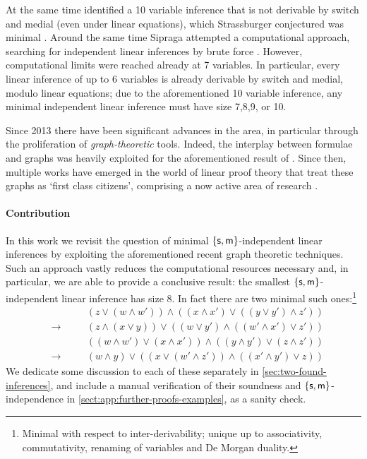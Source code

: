\documentclass[a4paper, UKenglish, cleveref]{lipics-v2019}
\begin{document}
At the same time \cite{Das13:lin-inf-rew} identified a 10 variable inference that is not derivable by switch and medial (even under linear equations), which Strassburger conjectured was minimal \cite{Str12:private-conjecture}.
Around the same time Sipraga attempted a computational approach, searching for independent linear inferences by brute force \cite{Sip12:aut-search-lin-inf}.
However, computational limits were reached already at 7 variables.
In particular, every linear inference of up to 6 variables is already derivable by switch and medial, modulo linear equations; due to the aforementioned 10 variable inference, any minimal independent linear inference must have size 7,8,9, or 10.


Since 2013 there have been significant advances in the area, in particular through the proliferation of \emph{graph-theoretic} tools.
Indeed, the interplay between formulae and graphs was heavily exploited for the aforementioned result of \cite{DasStr15:no-comp-lin-sys,DasStr16:no-compl-lin-sys}.
Since then, multiple works have emerged in the world of linear proof theory that treat these graphs as `first class citizens', comprising a now active area of research \cite{NguSei18:coh-int-graphs,AccHorStr20:mll-graphs-short,AccHorStr20:mll-graphs-full,CalDasWar20:bgl}.


\paragraph*{Contribution}
In this work we revisit the question of minimal $\{\mathsf{s},\mathsf{m}\}$-independent linear inferences by exploiting the aforementioned recent graph theoretic techniques.
Such an approach vastly reduces the computational resources necessary and, in particular, we are able to provide a conclusive result:
the smallest $\{\mathsf{s},\mathsf{m} \}$-independent linear inference has size 8. In fact there are two minimal such ones:\footnote{Minimal with respect to inter-derivability; unique up to associativity, commutativity, renaming of variables and De Morgan duality.}
\begin{equation}
  \label{eq:php32-derived-inf}
  \begin{alignedat}{2}
    & &&(z \lor (w \land w')) \land ((x \land x' ) \lor ((y \lor y') \land z'))\\
    & \to &\quad&(z \land (x \lor y)) \lor ((w \lor y') \land ((w' \land x')  \lor z') )
  \end{alignedat}
\end{equation}
\vspace{-5pt}%
\begin{equation}
  \label{eq:counterexample-inference}
  \begin{alignedat}{2}
    & &&((w \land w') \lor (x \land x')) \land ((y \land y') \lor (z \land z'))\\
    & \to&\quad& (w \land y) \lor ((x \lor (w'\land z')) \land ((x'\land y') \lor z) )
  \end{alignedat}
\end{equation}
We dedicate some discussion to each of these separately in \cref{sec:two-found-inferences}, and include a manual verification of their soundness and $\{\mathsf{s},\mathsf{m} \}$-independence in \cref{sect:app:further-proofs-examples}, as a sanity check.
\end{document}
